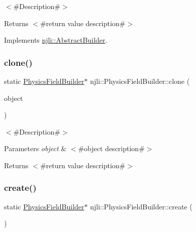 $<$\#\+Description\#$>$

\begin{DoxyReturn}{Returns}
$<$\#return value description\#$>$ 
\end{DoxyReturn}


Implements \mbox{\hyperlink{classnjli_1_1_abstract_builder_aa1d220053e182c37b31b427499c6eacf}{njli\+::\+Abstract\+Builder}}.

\mbox{\label{classnjli_1_1_physics_field_builder_ae22483c5cbbe46de578d2ea76184419b}} 
\subsubsection{\texorpdfstring{clone()}{clone()}}
{\footnotesize\ttfamily static \mbox{\hyperlink{classnjli_1_1_physics_field_builder}{Physics\+Field\+Builder}}$\ast$ njli\+::\+Physics\+Field\+Builder\+::clone (\begin{DoxyParamCaption}\item[{const \mbox{\hyperlink{classnjli_1_1_physics_field_builder}{Physics\+Field\+Builder}} \&}]{object }\end{DoxyParamCaption})\hspace{0.3cm}{\ttfamily [static]}}

$<$\#\+Description\#$>$


\begin{DoxyParams}{Parameters}
{\em object} & $<$\#object description\#$>$\\
\hline
\end{DoxyParams}
\begin{DoxyReturn}{Returns}
$<$\#return value description\#$>$ 
\end{DoxyReturn}
\mbox{\label{classnjli_1_1_physics_field_builder_ac4194a649769d0cd234e9174ccd56257}} 
\subsubsection{\texorpdfstring{create()}{create()}}
{\footnotesize\ttfamily static \mbox{\hyperlink{classnjli_1_1_physics_field_builder}{Physics\+Field\+Builder}}$\ast$ njli\+::\+Physics\+Field\+Builder\+::create (\begin{DoxyParamCaption}{ }\end{DoxyParamCaption})\hspace{0.3cm}{\ttfamily [static]}}

